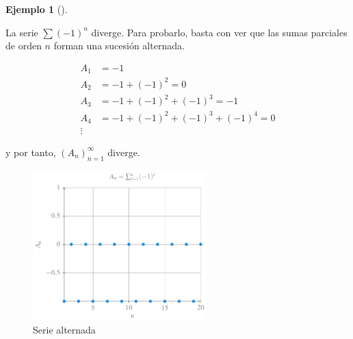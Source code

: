 \documentclass[
  a4paper,
]{scrreport}
\theoremstyle{definition}
\newtheorem{example}{Ejemplo}[chapter]
\theoremstyle{plain}
\theoremstyle{definition}
\theoremstyle{definition}
\theoremstyle{plain}
\theoremstyle{plain}
\theoremstyle{remark}
\begin{document}
\begin{example}[]\protect\hypertarget{exm-serie-divergente}{}\label{exm-serie-divergente}

La serie \(\sum (-1)^n\) diverge. Para probarlo, basta con ver que las
sumas parciales de orden \(n\) forman una sucesión alternada.

\begin{align*}
A_1 &= -1\\ 
A_2 &= -1+ (-1)^2 = 0 \\ 
A_3 &= -1+ (-1)^2 + (-1)^3 = -1\\ 
A_4 &= -1+ (-1)^2 + (-1)^3 + (-1)^4= 0\\ 
\vdots 
\end{align*}

y por tanto, \((A_n)_{n=1}^\infty\) diverge.

\begin{figure}[H]

{\centering \includegraphics[width=0.6\textwidth,height=\textheight]{img/series/serie-alternada.pdf}

}

\caption{Serie alternada}

\end{figure}%

\end{example}
\end{document}
